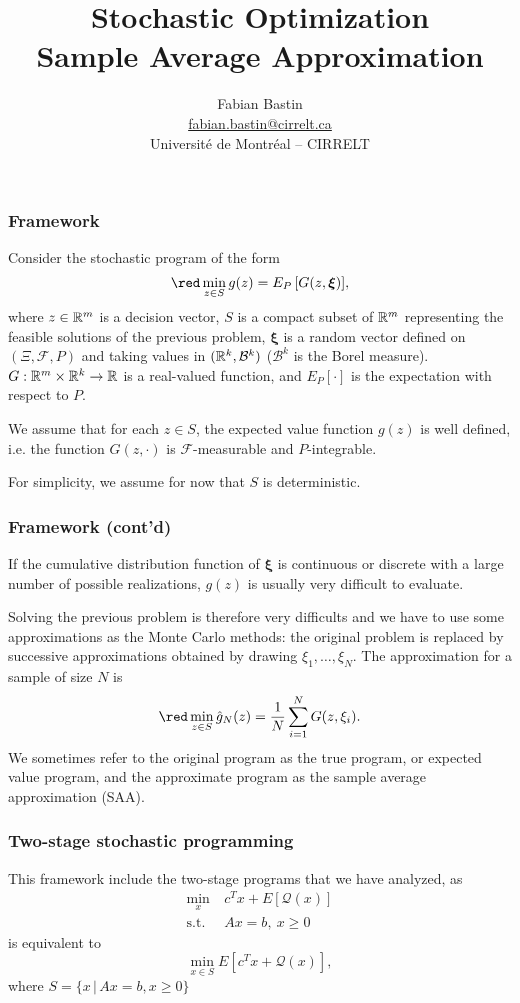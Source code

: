 \documentclass{beamer}
\title[SAA]{Stochastic Optimization\\Sample Average Approximation}
\author[Fabian Bastin]{Fabian Bastin\\\url{fabian.bastin@cirrelt.ca}\\Université de Montréal -- CIRRELT}
\date{}
\def\bxi{\boldsymbol\xi}
\def\cQ{\mathcal{Q}}
\begin{document}
\frame{\titlepage}

\begin{frame}
\frametitle{Framework}

Consider the stochastic program of the form
\[
{\red \min_{z \in S} g(z) = E_P \left[ G(z, \bxi) \right]},
\]
where $z \in \mathbb{R}^m$ is a decision vector, $S$ is a compact subset of $\mathbb{R}^m$ representing the feasible solutions of the previous problem, $\bxi$ is a random vector defined on $( \Xi, \mathcal{F}, P )$ and taking values in $( \mathbb{R}^k, \mathcal{B}^k )$ ($\mathcal{B}^k$ is the Borel measure).
$G: \mathbb{R}^m \times \mathbb{R}^k \rightarrow \mathbb{R}$ is a real-valued function, and $E_P[\cdot]$ is the expectation with respect to $P$.

\mbox{}

We assume that for each $z \in S$, the expected value function $g(z)$ is well defined, i.e. the function $G(z,\cdot)$ is $\mathcal{F}$-measurable and $P$-integrable.

\mbox{}

For simplicity, we assume for now that {\blue $S$ is deterministic}.

\end{frame}

\begin{frame}
\frametitle{Framework (cont'd)}

If the cumulative distribution function of $\bxi$ is continuous or discrete with a large number of possible realizations, $g(z)$ is usually very difficult to evaluate.

\mbox{}

Solving the previous problem is therefore very difficults and we have to use some approximations as the Monte Carlo methods: the original problem is replaced by successive approximations obtained by drawing $\xi_1,\ldots{}, \xi_N$.
The approximation for a sample of size $N$ is
\[
{\red \min_{z \in S} \hat{g}_N(z) = \frac{1}{N} \sum_{i = 1}^N
  G(z, \xi_i)}.
\]
We sometimes refer to the original program as the {\blue true program}, or {\blue expected value program}, and the approximate program as the {\blue sample average approximation (SAA)}.

\end{frame}

\begin{frame}
\frametitle{Two-stage stochastic programming}

This framework include the two-stage programs that we have analyzed, as
\begin{align*}
\min_x\ & c^Tx + E[\cQ(x)] \\
\mbox{s.t. } & Ax = b,\ x \geq 0
\end{align*}
is equivalent to
$$
\min_{x \in S} E[c^Tx + \cQ(x)],
$$
where $S = \{ x \,|\, Ax = b, x \geq 0 \}$

\end{frame}
\end{document}
